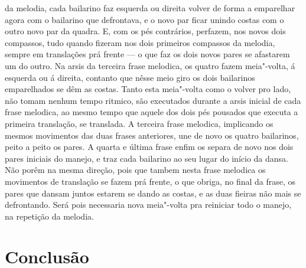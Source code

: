 da melodia, cada bailarino faz esquerda ou direita volver de forma a
emparelhar agora com o bailarino que defrontava, e o novo par ficar
unindo costas com o outro novo par da quadra. E, com os pés contrários,
perfazem, nos novos dois compassos, tudo quando fizeram nos dois
primeiros compassos da melodia, sempre em translações prá frente --- o
que faz os dois novos pares se afastarem um do outro. Na arsis da
terceira frase melodica, os quatro fazem meia"-volta, á esquerda ou á
direita, contanto que nêsse meio giro os dois bailarinos emparelhados se
dêm as costas. Tanto esta meia"-volta como o volver pro lado, não tomam
nenhum tempo ritmico, são executados durante a arsis inicial de cada
frase melodica, ao mesmo tempo que aquele dos dois pés pousados que
executa a primeira translação, se translada. A terceira frase melodica,
implicando os mesmos movimentos das duas frases anteriores, une de novo
os quatro bailarinos, peito a peito os pares. A quarta e última frase
enfim os separa de novo nos dois pares iniciais do manejo, e traz cada
bailarino ao seu lugar do início da dansa. Não porêm na mesma direção,
pois que tambem nesta frase melodica os movimentos de translação se
fazem prá frente, o que obriga, no final da frase, os pares que dansam
juntos estarem se dando as costas, e as duas fieiras não mais se
defrontando. Será pois necessaria nova meia"-volta pra reiniciar todo o
manejo, na repetição da melodia.


\section*{Conclusão}

